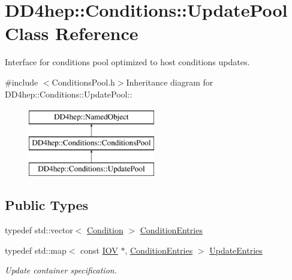 \hypertarget{class_d_d4hep_1_1_conditions_1_1_update_pool}{
\section{DD4hep::Conditions::UpdatePool Class Reference}
\label{class_d_d4hep_1_1_conditions_1_1_update_pool}
}


Interface for conditions pool optimized to host conditions updates.  


{\ttfamily \#include $<$ConditionsPool.h$>$}Inheritance diagram for DD4hep::Conditions::UpdatePool::\begin{figure}[H]
\begin{center}
\leavevmode
\includegraphics[height=3cm]{class_d_d4hep_1_1_conditions_1_1_update_pool}
\end{center}
\end{figure}
\subsection*{Public Types}
\begin{DoxyCompactItemize}
\item 
typedef std::vector$<$ \hyperlink{class_d_d4hep_1_1_conditions_1_1_condition}{Condition} $>$ \hyperlink{class_d_d4hep_1_1_conditions_1_1_update_pool_ad6bcf36ae0a7dee0a08e1045d8612c6e}{ConditionEntries}
\item 
typedef std::map$<$ const \hyperlink{class_d_d4hep_1_1_i_o_v}{IOV} $\ast$, \hyperlink{class_d_d4hep_1_1_conditions_1_1_update_pool_ad6bcf36ae0a7dee0a08e1045d8612c6e}{ConditionEntries} $>$ \hyperlink{class_d_d4hep_1_1_conditions_1_1_update_pool_a1a578a7a025ded412da474be106dc780}{UpdateEntries}
\begin{DoxyCompactList}\small\item\em Update container specification. \item\end{DoxyCompactList}\end{DoxyCompactItemize}
